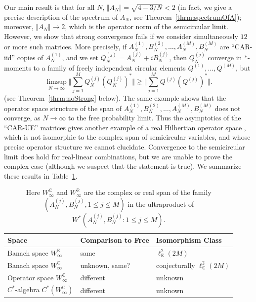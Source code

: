 \documentclass[11pt]{article}
\begin{document}
Our main result is that for all $N$,  $\Vert A_N \Vert = \sqrt{4-3/N} < 2$ (in fact, we give a precise description of the spectrum of $A_N$, see Theorem~\ref{thrm:spectrumOfA}); moreover, $\Vert A_N\Vert\to 2$, which is the operator norm of the semicircular limit. However, we show that strong convergence fails if we consider simultaneously $12$ or more such matrices. More precisely, if $A_N^{(1)}, B_N^{(2)},\dots,A_N^{(M)},B_N^{(M)}$ are ``CAR-iid'' copies of $A_N^{(1)}$, and we set $Q_N^{(j)} = A_N^{(j)} + i B_N^{(j)}$, then $Q_N^{(j)}$ converge in $*$-moments to a family of freely independent circular elements $Q^{(1)},\dots,Q^{(M)}$, but $$\limsup_{N\to\infty} \Big\Vert \sum_{j=1}^M Q_N^{(j)} (Q_N^{(j)})^*\Big\Vert \gneq \Big\Vert \sum_{j=1}^M Q^{(j)} (Q^{(j)})^*\Big\Vert. $$ (see Theorem~\ref{thrm:noStrong} below). The same example shows that the operator space structure of the span of $A_N^{(1)}, B_N^{(2)},\dots,A_N^{(M)},B_N^{(M)}$ does not converge, as $N\to\infty$ to the free probability limit. Thus the asymptotics of the ``CAR-UE'' matrices gives another example of a real Hilbertian operator space \cite{Pisier:Book}, which is not isomorphic to the complex span of semicircular variables, and whose precise operator structure we cannot elucidate.  Convergence to the semicircular limit does hold for real-linear combinations, but we are unable to prove the complex case (although we suspect that the statement is true). We summarize these results in Table~\ref{tbl:asymptoticComparison}.

\begin{table}[h]
\begin{center}
\begin{tabular}{lll}
Space & Comparison to Free  &  Isomorphism Class \\
\toprule
Banach space $W_\infty^\mathbb{R}$ &  same & $ \ell_\mathbb{R}^2(2M)$  \\
Banach space $W_\infty^\mathbb{C}$ &
unknown, same? &  conjecturally $\ell^2_{\mathbb{C}}(2M)$ \\
Operator space  $W_\infty^\mathbb{C}$  & 
different & unknown \\ 
$C^*$-algebra $C^*(W_\infty^{\mathbb{C}})$ & different & unknown \\
\bottomrule 
\end{tabular}
\caption{Here $W^{\mathbb{C}}_\infty$ and $W^{\mathbb{R}}_\infty$ are the complex or real span of the family $(A^{(j)}_N,B^{(j)}_N, 1\leq j\leq M)$ in the ultraproduct of  $W^*(A^{(j)}_N,B^{(j)}_N:1\leq j\leq M).$ } \label{tbl:asymptoticComparison}
\end{center}
\end{table}
\end{document}
